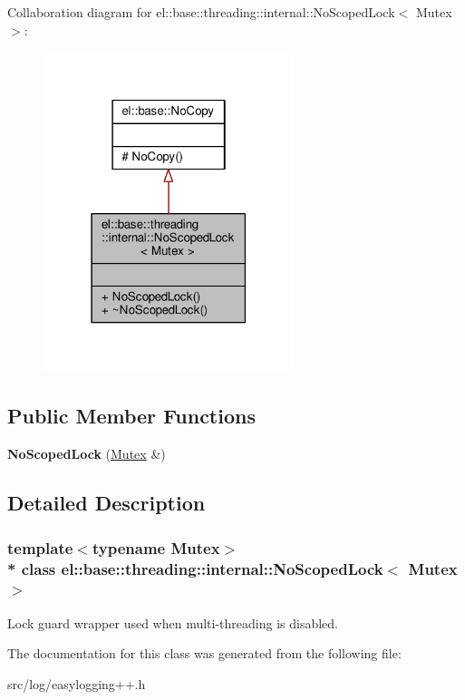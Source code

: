 Collaboration diagram for el\+:\+:base\+:\+:threading\+:\+:internal\+:\+:No\+Scoped\+Lock$<$ Mutex $>$\+:
\nopagebreak
\begin{figure}[H]
\begin{center}
\leavevmode
\includegraphics[width=207pt]{d0/d05/classel_1_1base_1_1threading_1_1internal_1_1NoScopedLock__coll__graph}
\end{center}
\end{figure}
\subsection*{Public Member Functions}
\begin{DoxyCompactItemize}
\item 
{\bfseries No\+Scoped\+Lock} (\hyperlink{classel_1_1base_1_1threading_1_1internal_1_1NoMutex}{Mutex} \&)\hypertarget{classel_1_1base_1_1threading_1_1internal_1_1NoScopedLock_a020f8cea6e83f40ea29662ef57a58235}{}\label{classel_1_1base_1_1threading_1_1internal_1_1NoScopedLock_a020f8cea6e83f40ea29662ef57a58235}

\end{DoxyCompactItemize}


\subsection{Detailed Description}
\subsubsection*{template$<$typename Mutex$>$\\*
class el\+::base\+::threading\+::internal\+::\+No\+Scoped\+Lock$<$ Mutex $>$}

Lock guard wrapper used when multi-\/threading is disabled. 

The documentation for this class was generated from the following file\+:\begin{DoxyCompactItemize}
\item 
src/log/easylogging++.\+h\end{DoxyCompactItemize}

